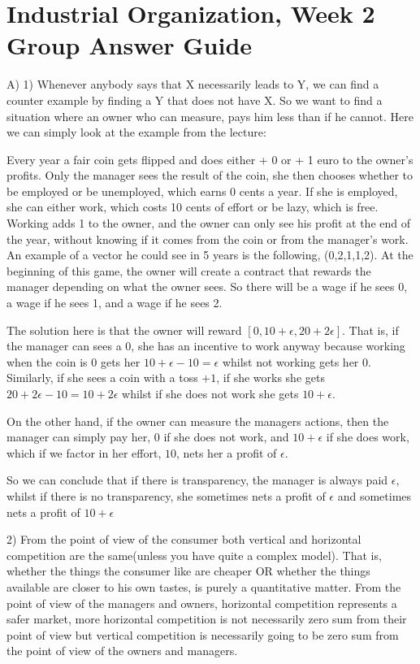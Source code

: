 \documentclass[12pt]{report}
\numberwithin{equation}{section}
\begin{document}
\section{Industrial Organization, Week 2 Group Answer Guide}
A)
1)
Whenever anybody says that X necessarily leads to Y, we can find a counter example by finding a Y that does not have X. So we want to find a situation where an owner who can measure, pays him less than if he cannot. Here we can simply look at the example from the lecture:

Every year a fair coin gets flipped and does either + 0 or + 1 euro to the owner's profits. Only the manager sees the result of the coin, she then chooses whether to be employed or be unemployed, which earns 0 cents a year. If she is employed, she can either work, which costs 10 cents of effort or be lazy, which is free. Working adds 1 to the owner, and the owner can only see his profit at the end of the year, without knowing if it comes from the coin or from the manager's work. An example of a vector he could see in 5 years is the following, (0,2,1,1,2). At the beginning of this game, the owner will create a contract that rewards the manager depending on what the owner sees.  So there will be a wage if he sees 0, a wage if he sees 1, and a wage if he sees 2. 

The solution here is that the owner will reward $[0,10+\epsilon,20+2 \epsilon]$. That is, if the manager can sees a 0, she has an incentive to work anyway because working when the coin is 0 gets her $10+\epsilon -10=\epsilon$ whilst not working gets her $0$. Similarly, if she sees a coin with a toss $+1$, if she works she gets $20+2 \epsilon -10 = 10+2 \epsilon$ whilst if she does not work she gets $10+\epsilon$. 

On the other hand, if the owner can measure the managers actions, then the manager can simply pay her, 0 if she does not work, and $10+\epsilon$ if she does work, which if we factor in her effort, $10$, nets her a profit of $\epsilon$. 

So we can conclude that if there is transparency, the manager is always paid $\epsilon$, whilst if there is no transparency, she sometimes nets a profit of $\epsilon$ and sometimes nets a profit of $10+ \epsilon$ 

2)
From the point of view of the consumer both vertical and horizontal competition are the same(unless you have quite a complex model). That is, whether the things the consumer like are cheaper OR whether the things available are closer to his own tastes, is purely a quantitative matter. From the point of view of the managers and owners, horizontal competition represents a safer market, more horizontal competition is not necessarily zero sum from their point of view but vertical competition is necessarily going to be zero sum from the point of view of the owners and managers. 
\end{document}
